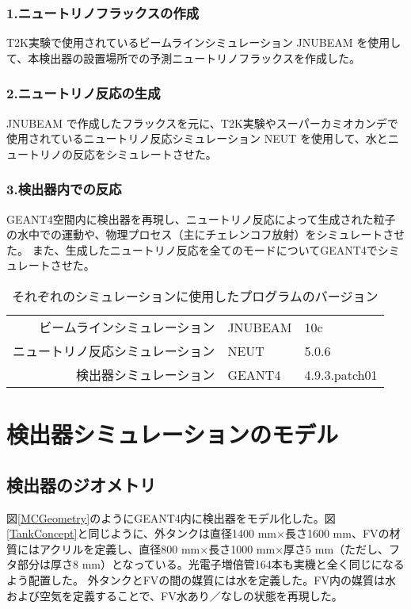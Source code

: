 \documentclass[11pt]{ltjsreport}
\newcommand{\figref}[1]{図\ref{#1}}
\begin{document}
\subsubsection{1.ニュートリノフラックスの作成}
T2K実験で使用されているビームラインシミュレーション JNUBEAM を使用して、本検出器の設置場所での予測ニュートリノフラックスを作成した。

\subsubsection{2.ニュートリノ反応の生成}
JNUBEAM で作成したフラックスを元に、T2K実験やスーパーカミオカンデで使用されているニュートリノ反応シミュレーション NEUT を使用して、水とニュートリノの反応をシミュレートさせた。

\subsubsection{3.検出器内での反応}
GEANT4空間内に検出器を再現し、ニュートリノ反応によって生成された粒子の水中での運動や、物理プロセス（主にチェレンコフ放射）をシミュレートさせた。
また、生成したニュートリノ反応を全てのモードについてGEANT4でシミュレートさせた。

\begin{table}[!htbp]
\caption[シミュレーションプログラムのバージョン]{それぞれのシミュレーションに使用したプログラムのバージョン}
\begin{center}
\begin{tabular}{rll}
\hline \hline
ビームラインシミュレーション & JNUBEAM &10c\\
ニュートリノ反応シミュレーション & NEUT & 5.0.6\\
検出器シミュレーション & GEANT4 & 4.9.3.patch01\\
\hline \hline
\end{tabular}
\end{center}
\label{MCProgramTable}
\end{table}%
\fi

\section{検出器シミュレーションのモデル}
\subsection{検出器のジオメトリ}
\figref{MCGeometry}のようにGEANT4内に検出器をモデル化した。\figref{TankConcept}と同じように、外タンクは直径1400 mm$\times$長さ1600 mm、FVの材質にはアクリルを定義し、直径800 mm$\times$長さ1000 mm$\times$厚さ5 mm（ただし、フタ部分は厚さ8 mm）となっている。光電子増倍管164本も実機と全く同じになるよう配置した。
外タンクとFVの間の媒質には水を定義した。FV内の媒質は水および空気を定義することで、FV水あり／なしの状態を再現した。
\end{document}
